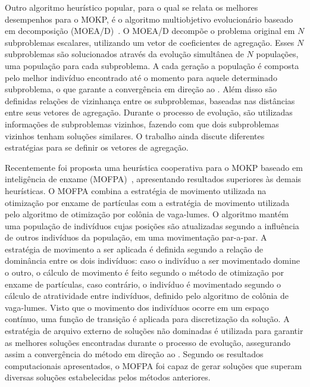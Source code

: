Outro algoritmo heurístico popular, para o qual se relata os melhores desempenhos para o MOKP,
é o algoritmo multiobjetivo evolucionário baseado em decomposição (MOEA/D)~\cite{zhang2007moea}.
O MOEA/D decompõe o problema original em $N$ subproblemas escalares, utilizando
um vetor de coeficientes de agregação.
Esses $N$ subproblemas são solucionados
através da evolução simultânea de $N$ populações, uma população para cada subproblema.
A cada geração a população é composta pelo melhor indivíduo encontrado até o momento
para aquele determinado subproblema, o que garante a convergência em direção ao \paretoset{}.
Além disso são definidas relações de vizinhança entre os subproblemas, baseadas
nas distâncias entre seus vetores de agregação.
Durante o processo de evolução, são utilizadas informações de subproblemas vizinhos,
fazendo com que dois subproblemas vizinhos tenham soluções similares.
O trabalho ainda discute diferentes estratégias para se definir os vetores de agregação.

Recentemente foi proposta uma heurística cooperativa para o MOKP baseado
em inteligência de enxame (MOFPA)~\cite{zouache2018cooperative},
apresentando resultados superiores às demais heurísticas.
O MOFPA combina a estratégia de movimento utilizada na otimização
por enxame de partículas com a estratégia de movimento
utilizada pelo algoritmo de otimização por colônia de vaga-lumes.
O algoritmo mantém uma população de indivíduos cujas posições
são atualizadas segundo a influência de outros indivíduos da população,
em uma movimentação par-a-par.
A estratégia de movimento a ser aplicada é definida
segundo a relação de dominância entre os dois indivíduos:
caso o indivíduo a ser movimentado domine o outro, o cálculo de movimento
é feito segundo o método de otimização por enxame de partículas,
caso contrário, o indivíduo é movimentado segundo o cálculo de atratividade
entre indivíduos, definido pelo algoritmo de colônia de vaga-lumes.
Visto que o movimento dos indivíduos ocorre em um espaço
contínuo, uma função de transição é aplicada para discretização da solução.
A estratégia de arquivo externo de soluções não dominadas
é utilizada para garantir as melhores soluções encontradas durante o processo de evolução,
assegurando assim a convergência do método em direção ao \paretoset{}.
Segundo os resultados computacionais apresentados,
o MOFPA foi capaz de gerar soluções
que superam diversas soluções estabelecidas pelos métodos anteriores.

